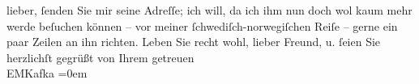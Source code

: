 \begin{ledgroupsized}[t]{13cm}
                    lieber, ſenden Sie mir seine Adreſſe; ich will, da ich ihm nun doch wol kaum
                    mehr werde beſuchen können – vor meiner ſchwediſch-norwegiſchen Reiſe –
                    gerne ein paar Zeilen an ihn richten.\pend
           \pstart
           Leben Sie recht wohl, lieber Freund, u. ſeien Sie herzlichſt gegrüßt\pend
           \pstart
           von Ihrem getreuen{\\[\baselineskip]}\spacefill\mbox{EMKafka}\pend
           \leftskip=0em{}          \endnumbering{}\end{ledgroupsized}  \newcommand{\dateiname}{L00187}\newcommand{\titel}{Eduard Michael Kafka an Arthur Schnitzler, 7. 3. 1893}\newcommand{\editorInnen}{Martin Anton Müller und Gerd-Hermann Susen}
      